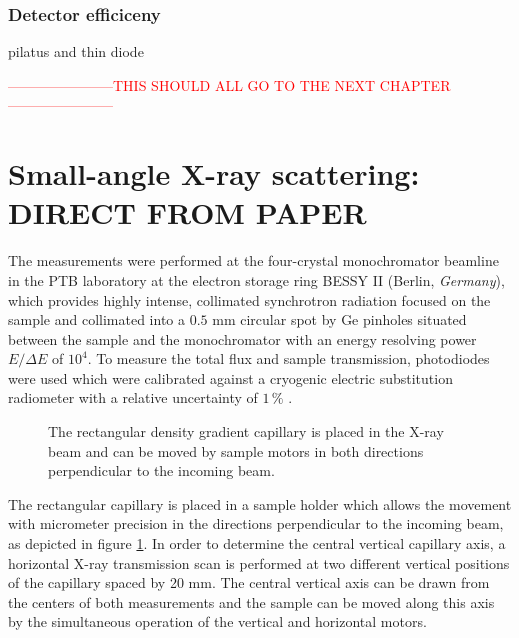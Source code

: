 \subsubsection{Detector efficiceny}
pilatus and thin diode





















\textcolor{red}{-----------------------THIS SHOULD ALL GO TO THE NEXT CHAPTER-----------------------}











\section{Small-angle X-ray scattering: DIRECT FROM PAPER}
The measurements were performed at the four-crystal monochromator beamline in the PTB laboratory at the electron storage ring BESSY II (Berlin, \emph{Germany}), which provides highly intense, collimated synchrotron radiation focused on the sample and collimated into a \(0.5\) mm circular spot by Ge pinholes situated between the sample and the monochromator with an energy resolving power \( E/\Delta E \) of \( 10^4 \). To measure the total flux and sample transmission, photodiodes were used which were calibrated against a cryogenic electric substitution radiometer with a relative uncertainty of \( 1\,\% \) \cite{krumrey_high-accuracy_2001}.


\begin{figure}%
	\centering
		
		\caption{The rectangular density gradient capillary is placed in the X-ray beam and can be moved by sample motors in both directions perpendicular to the incoming beam.}
		\label{fig:DensityGradientCapillarySetup}
\end{figure}

The rectangular capillary is placed in a sample holder which allows the movement with micrometer precision in the directions perpendicular to the incoming beam, as depicted in figure \ref{fig:DensityGradientCapillarySetup}. In order to determine the central vertical capillary axis, a horizontal X-ray transmission scan is performed at two different vertical positions of the capillary spaced by 20 mm. The central vertical axis can be drawn from the centers of both measurements and the sample can be moved along this axis by the simultaneous operation of the vertical and horizontal motors.


